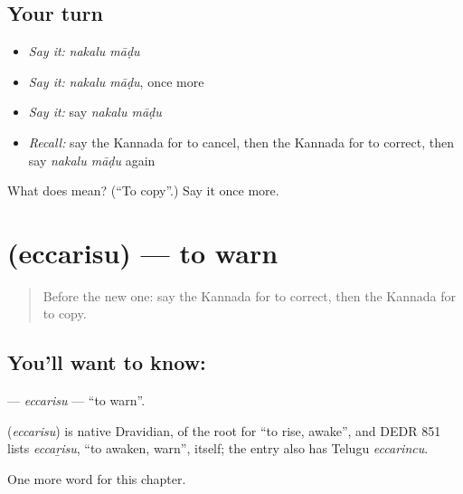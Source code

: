 \subsection*{Your turn}
\begin{itemize}
\raggedright
  \item \emph{Say it:} \emph{nakalu māḍu}
  \item \emph{Say it:} \emph{nakalu māḍu}, once more
  \item \emph{Say it:} say \emph{nakalu māḍu}
  \item \emph{Recall:} say the Kannada for to cancel, then the Kannada for to correct, then say \emph{nakalu māḍu} again
\end{itemize}

\begin{tcolorbox}[breakable,colback=teal!4,colframe=teal!35!black,title={Before you move on}]
What does   mean? (\textquotedblleft{}To copy\textquotedblright{}.) Say it once more.
\end{tcolorbox}
\section[\texorpdfstring{\kn{ಎಚ್ಚರಿಸು} (eccarisu)}{ಎಚ್ಚರಿಸು (eccarisu)}]{ (eccarisu) — to warn}

\label{lesson:KA-C162-eccarisu}



\begin{quote}
Before the new one: say the Kannada for to correct, then the Kannada for to copy.
\end{quote}

\subsection*{You'll want to know: }
\textbf{} — \emph{eccarisu} — \textquotedblleft{}to warn\textquotedblright{}.

\begin{cousinweb}
\textbf{} (\emph{eccarisu}) is native Dravidian, of the root for \textquotedblleft{}to rise, awake\textquotedblright{}, and DEDR 851 lists \emph{eccaṟisu}, \textquotedblleft{}to awaken, warn\textquotedblright{}, itself; the entry also has Telugu \emph{eccarincu}.
\end{cousinweb}

\begin{grammarlens}[title={What you've built}]
One more word for this chapter.
\end{grammarlens}

